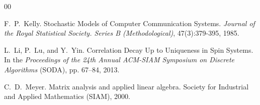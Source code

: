 \documentclass[11pt,reqno]{amsart}
\numberwithin{equation}{section}
\newcommand{\red}[1]{{\color{red}#1}}
\renewcommand{\red}[1]{#1}
\begin{document}
\begin{thebibliography}{00}


F.~P.~Kelly. Stochastic Models of Computer Communication Systems.
{\em Journal of the Royal Statistical Society. Series B (Methodological)},
47(3):379-395, 1985.








%



L.~Li, P.~Lu, and Y.~Yin. Correlation Decay Up to Uniqueness in Spin Systems. 
In the {\em Proceedings of the 24th Annual ACM-SIAM Symposium on Discrete Algorithms} (SODA), pp. 67--84, 2013.

 



C.~D.~Meyer. Matrix analysis and applied linear algebra. 	Society for Industrial and Applied Mathematics (SIAM), 2000.









\end{thebibliography}
\end{document}
